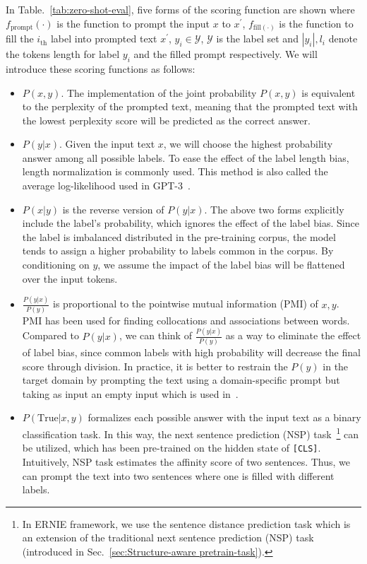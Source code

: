 In Table.~\ref{tab:zero-shot-eval}, five forms of the scoring function are shown where $f_{\text{prompt}}(\cdot)$ is the function to prompt the input $x$ to $x^{'}$, $f_{\text{fill}(\cdot)}$ is the function to fill the $i_\text{th}$ label into prompted text $x^{'}$, $y_i \in \mathcal{Y}$, $\mathcal{Y}$ is the label set and $|y_i|, l_i$ denote the tokens length for label $y_i$ and the filled prompt respectively. We will introduce these scoring functions as follows:

\begin{itemize}
    \item \textbf{$P(x, y)$}. The implementation of the joint probability $P(x, y)$ is equivalent to the perplexity of the prompted text, meaning that the prompted text with the lowest perplexity score will be predicted as the correct answer. 
    \item \textbf{$P(y|x)$}. Given the input text $x$, we will choose the highest probability answer among all possible labels. To ease the effect of the label length bias, length normalization is commonly used. This method is also called the average log-likelihood used in GPT-3~\cite{gpt-3}.
    \item \textbf{$P(x|y)$} is the reverse version of $P(y | x)$. The above two forms explicitly include the label's probability, which ignores the effect of the label bias. Since the label is imbalanced distributed in the pre-training corpus, the model tends to assign a higher probability to labels common in the corpus. By conditioning on $y$, we assume the impact of the label bias will be flattened over the input tokens.
    \item \textbf{$\frac{P(y|x)}{P(y)}$} is proportional to the pointwise mutual information (PMI) of $x, y$. PMI has been used for finding collocations and associations between words. Compared to $P(y|x)$, we can think of $\frac{P(y|x)}{P(y)}$ as a way to eliminate the effect of label bias, since common labels with high probability will decrease the final score through division. In practice, it is better to restrain the $P(y)$ in the target domain by prompting the text using a domain-specific prompt but taking as input an empty input which is used in~\cite{AriHoltzman2021SurfaceFC}.
    \item $P(\text{True}|x, y)$ formalizes each possible answer with the input text as a binary classification task. In this way, the next sentence prediction (NSP) task~\footnote{In ERNIE framework, we use the sentence distance prediction task which is an extension of the traditional next sentence prediction (NSP) task (introduced in Sec.~\ref{sec:Structure-aware pretrain-task}).} can be utilized, which has been pre-trained on the hidden state of \texttt{[CLS]}. Intuitively, NSP task estimates the affinity score of two sentences. Thus, we can prompt the text into two sentences where one is filled with different labels.
\end{itemize}

